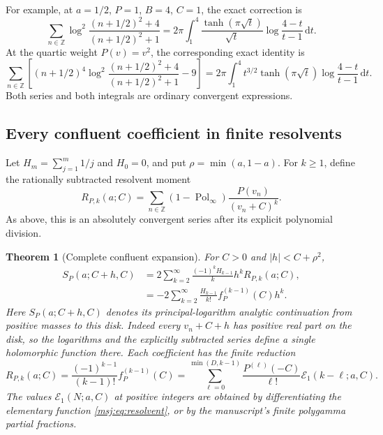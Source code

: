 \documentclass[11pt,a4paper]{article}
\numberwithin{equation}{section}
\theoremstyle{plain}
\newtheorem{theorem}{Theorem}[section]
\theoremstyle{definition}
\theoremstyle{remark}
\begin{document}
For example, at $a=1/2$, $P=1$, $B=4$, $C=1$, the exact correction is
\begin{equation}
 \sum_{n\in\mathbb Z}
 \log^2\frac{(n+1/2)^2+4}{(n+1/2)^2+1}
 =2\pi\int_1^4\frac{\tanh(\pi\sqrt t)}{\sqrt t}
                      \log\frac{4-t}{t-1}\,\mathrm dt.
 \label{msj:eq:example-unweighted}
\end{equation}
At the quartic weight $P(v)=v^2$, the corresponding exact identity is
\begin{equation}
 \sum_{n\in\mathbb Z}\left[
 (n+1/2)^4\log^2\frac{(n+1/2)^2+4}{(n+1/2)^2+1}-9\right]
 =2\pi\int_1^4 t^{3/2}\tanh(\pi\sqrt t)
                       \log\frac{4-t}{t-1}\,\mathrm dt.
 \label{msj:eq:example-weighted}
\end{equation}
Both series and both integrals are ordinary convergent expressions.

\subsection{Every confluent coefficient in finite resolvents}

Let $H_m=\sum_{j=1}^m1/j$ and $H_0=0$, and put
$\rho=\min(a,1-a)$. For $k\ge1$, define the rationally subtracted
resolvent moment
\begin{equation}
 R_{P,k}(a;C)
 =\sum_{n\in\mathbb Z}(1-\operatorname{Pol}_{\infty})
                         \frac{P(v_n)}{(v_n+C)^k}.
 \label{msj:eq:Rpk}
\end{equation}
As above, this is an absolutely convergent series after its explicit
polynomial division.

\begin{theorem}[Complete confluent expansion]
\label{msj:thm:confluent}
For $C>0$ and $|h|<C+\rho^2$,
\begin{align}
 S_P(a;C+h,C)
 &=2\sum_{k=2}^{\infty}\frac{(-1)^kH_{k-1}}{k}
                       h^k R_{P,k}(a;C),
 \label{msj:eq:confluent-resolvent}\\
 &=-2\sum_{k=2}^{\infty}\frac{H_{k-1}}{k!}
                       f_P^{(k-1)}(C)h^k.
 \label{msj:eq:confluent-elementary}
\end{align}
Here $S_P(a;C+h,C)$ denotes its principal-logarithm analytic
continuation from positive masses to this disk.  Indeed every
$v_n+C+h$ has positive real part on the disk, so the logarithms
and the explicitly subtracted series define a single holomorphic
function there.
Each coefficient has the finite reduction
\begin{equation}
 R_{P,k}(a;C)
 =\frac{(-1)^{k-1}}{(k-1)!}f_P^{(k-1)}(C)
 =\sum_{\ell=0}^{\min(D,k-1)}
       \frac{P^{(\ell)}(-C)}{\ell!}
                          \mathcal E_1(k-\ell;a,C).
 \label{msj:eq:Rpk-finite}
\end{equation}
The values $\mathcal E_1(N;a,C)$ at positive integers are obtained by
differentiating the elementary function \eqref{msj:eq:resolvent}, or
by the manuscript's finite polygamma partial fractions.
\end{theorem}
\end{document}

